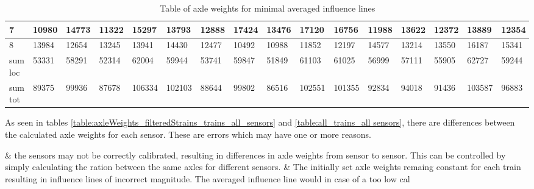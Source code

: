 \begin{sidewaystable}
{\begin{tabularx}{\textheight}{ |l|X|X|X|X|X|X|X|X|X|X|X|X|X|X|X| }
			\hline
			7 & 10980   &    14773   &    11322   &    15297   &    13793   &    12888    &   17424    &   13476    &   17120   &    16756   &    11988   &    13622   &    12372   &    13889 & 12354 \\
			\hline
			8 & 13984   &    12654   &    13245   &    13941   &    14430   &    12477    &   10492    &   10988    &   11852   &    12197   &    14577   &    13214   &    13550   &    16187 & 15341 \\
			\hline
			sum loc & 53331   &    58291   &    52314   &    62004   &    59944   &    53741    &   59847    &   51849    &   61103   &    61025   &    56999   &    57111   &    55905   &   62727 & 59244 \\
			\hline
			sum tot & 89375   &    99936   &    87678   &   106334   &   102103   &    88644    &   99802    &   86516    &  102551   &   101355   &    92834   &    94018   &    91436   &   103587 & 96883 \\
			\hline
		\end{tabularx}}
	\caption{Table of axle weights for minimal averaged influence lines}
	\label{table:axleWeights_for_minimalInfl}
\end{sidewaystable}

As seen in tables \ref{table:axleWeights_filteredStrains_trains_all_sensors} and \ref{table:all_trains_all sensors}, there are differences between the calculated axle weights for each sensor. These are errors which may have one or more reasons.
\begin{easylist}[itemize]
	& the sensors may not be correctly calibrated, resulting in differences in axle weights from sensor to sensor. This can be controlled by simply calculating the ration between the same axles for different sensors.
	& The initially set axle weights remaing constant for each train resulting in influence lines of incorrect magnitude. The averaged influence line would in case of a too low cal
\end{easylist}

